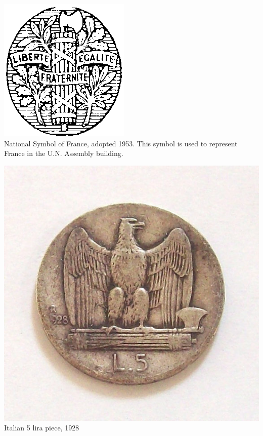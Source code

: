 \begin{frame}
    \centering
    \includegraphics[height=.8\textheight]{img/fasces/french-republic-symbol.png} \\
    National Symbol of France, adopted 1953. This symbol is used to represent France in the U.N. Assembly building. \\
\end{frame}
\begin{frame}
    \centering
    \includegraphics[height=.8\textheight]{img/fasces/italy-fasces-coin.jpg} \\
    Italian 5 lira piece, 1928 \\
\end{frame}

